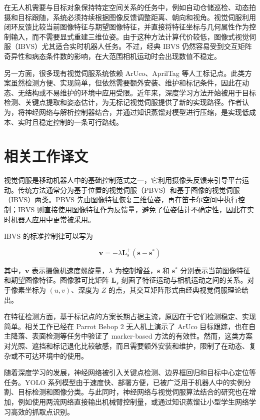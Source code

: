 在无人机需要与目标对象保持特定空间关系的任务中，例如自动仓储巡检、动态拍摄和目标跟随，系统必须持续根据图像反馈调整距离、朝向和视角。视觉伺服利用闭环反馈比较当前图像特征与期望图像特征，并直接将特征坐标与几何属性作为控制输入，而不需要显式重建三维位姿。由于这种方法计算代价较低，图像式视觉伺服（IBVS）尤其适合实时机器人任务。不过，经典 IBVS 仍然容易受到交互矩阵奇异性和病态条件数的影响，在大范围相机运动时会出现数值不稳定。

另一方面，很多现有视觉伺服系统依赖 ArUco、AprilTag 等人工标记点。此类方案虽然检测方便、实现简单，但依然需要额外安装、维护和标记条件，因此在动态、无结构或不易维护的环境中应用受限。近年来，深度学习方法开始被用于目标检测、关键点提取和姿态估计，为无标记视觉伺服提供了新的实现路径。作者认为，将神经网络与解析控制器结合，并通过知识蒸馏对模型进行压缩，是实现低成本、实时且稳定控制的一条可行路线。

\section{相关工作译文}
视觉伺服是移动机器人中的基础控制范式之一，它利用摄像头反馈来引导平台运动。传统方法通常分为基于位置的视觉伺服（PBVS）和基于图像的视觉伺服（IBVS）两类。PBVS 先由图像特征恢复三维位姿，再在笛卡尔空间中执行控制；IBVS 则直接使用图像特征作为反馈量，避免了位姿估计不确定性，因此在实时机器人应用中更常被采用。

IBVS 的标准控制律可以写为

\[
\mathbf{v} = -\lambda \mathbf{L}_s^+ (\mathbf{s} - \mathbf{s}^*)
\]

其中，$\mathbf{v}$ 表示摄像机速度螺旋量，$\lambda$ 为控制增益，$\mathbf{s}$ 和 $\mathbf{s}^*$ 分别表示当前图像特征和期望图像特征。图像雅可比矩阵 $\mathbf{L}_s$ 刻画了特征运动与相机运动之间的关系。对于像素坐标为 $(u,v)$、深度为 $Z$ 的点，其交互矩阵形式由经典视觉伺服理论给出。

在特征检测方面，基于标记点的方案长期占据主流，原因在于它们检测稳定、实现简单。相关工作已经在 Parrot Bebop 2 无人机上演示了 ArUco 目标跟踪，也在自主降落、表面检测等任务中验证了 marker-based 方法的有效性。然而，这类方案对光照、遮挡和标记退化比较敏感，而且需要额外安装和维护，限制了在动态、复杂或不可达环境中的使用。

随着深度学习的发展，神经网络被引入关键点检测、边界框回归和目标中心定位等任务。YOLO 系列模型由于速度快、部署方便，已被广泛用于机器人中的实例分割、目标检测和图像分类。与此同时，神经网络与视觉伺服算法结合的研究也在增加，例如使用两流网络直接输出机械臂控制量，或通过知识蒸馏让小型学生网络学习高效的抓取点识别。

